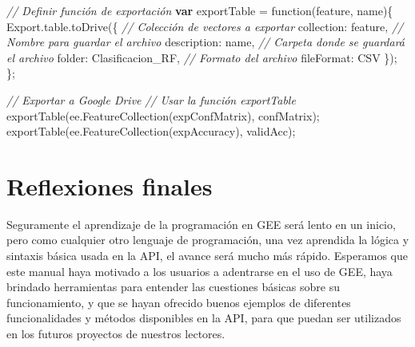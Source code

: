 \documentclass[
  12pt,
  letterpaper,
  twoside]{book}
\newenvironment{Shaded}{\begin{snugshade}}{\end{snugshade}}
\newcommand{\AttributeTok}[1]{\textcolor[rgb]{0.48,0.12,0.64}{#1}}
\newcommand{\CommentTok}[1]{\textcolor[rgb]{0.24,0.58,0.00}{\textit{#1}}}
\newcommand{\ControlFlowTok}[1]{\textcolor[rgb]{0.00,0.00,0.00}{\textbf{#1}}}
\newcommand{\DataTypeTok}[1]{\textcolor[rgb]{0.00,0.00,0.00}{#1}}
\newcommand{\FunctionTok}[1]{\textcolor[rgb]{0.48,0.12,0.64}{#1}}
\newcommand{\KeywordTok}[1]{\textcolor[rgb]{0.48,0.12,0.64}{#1}}
\newcommand{\NormalTok}[1]{#1}
\newcommand{\OperatorTok}[1]{\textcolor[rgb]{0.00,0.00,0.00}{#1}}
\newcommand{\StringTok}[1]{\textcolor[rgb]{0.87,0.29,0.22}{#1}}
\begin{document}
\begin{Shaded}
\begin{Highlighting}[]
\CommentTok{// Definir función de exportación}
\ControlFlowTok{var}\NormalTok{ exportTable }\OperatorTok{=} \KeywordTok{function}\NormalTok{(feature}\OperatorTok{,}\NormalTok{ name)\{}
\NormalTok{  Export}\OperatorTok{.}\AttributeTok{table}\OperatorTok{.}\FunctionTok{toDrive}\NormalTok{(\{}
    \CommentTok{// Colección de vectores a exportar}
    \DataTypeTok{collection}\OperatorTok{:}\NormalTok{ feature}\OperatorTok{,}
    \CommentTok{// Nombre para guardar el archivo}
    \DataTypeTok{description}\OperatorTok{:}\NormalTok{ name}\OperatorTok{,}
    \CommentTok{// Carpeta donde se guardará el archivo}
    \DataTypeTok{folder}\OperatorTok{:} \StringTok{\textquotesingle{}Clasificacion\_RF\textquotesingle{}}\OperatorTok{,}
    \CommentTok{// Formato del archivo}
    \DataTypeTok{fileFormat}\OperatorTok{:} \StringTok{\textquotesingle{}CSV\textquotesingle{}}
\NormalTok{ \})}\OperatorTok{;}
\NormalTok{\}}\OperatorTok{;}

\CommentTok{// Exportar a Google Drive}
\CommentTok{// Usar la función exportTable}
\FunctionTok{exportTable}\NormalTok{(}\KeywordTok{ee}\OperatorTok{.}\FunctionTok{FeatureCollection}\NormalTok{(expConfMatrix)}\OperatorTok{,} \StringTok{\textquotesingle{}confMatrix\textquotesingle{}}\NormalTok{)}\OperatorTok{;}
\FunctionTok{exportTable}\NormalTok{(}\KeywordTok{ee}\OperatorTok{.}\FunctionTok{FeatureCollection}\NormalTok{(expAccuracy)}\OperatorTok{,} \StringTok{\textquotesingle{}validAcc\textquotesingle{}}\NormalTok{)}\OperatorTok{;}
\end{Highlighting}
\end{Shaded}

\newpage

\hypertarget{reflexiones-finales}{%
\chapter{Reflexiones finales}\label{reflexiones-finales}}

Seguramente el aprendizaje de la programación en GEE será lento en un inicio, pero como cualquier otro lenguaje de programación, una vez aprendida la lógica y sintaxis básica usada en la API, el avance será mucho más rápido. Esperamos que este manual haya motivado a los usuarios a adentrarse en el uso de GEE, haya brindado herramientas para entender las cuestiones básicas sobre su funcionamiento, y que se hayan ofrecido buenos ejemplos de diferentes funcionalidades y métodos disponibles en la API, para que puedan ser utilizados en los futuros proyectos de nuestros lectores.
\end{document}
